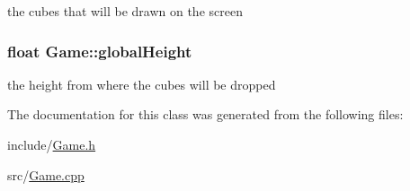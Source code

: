 the cubes that will be drawn on the screen 

\hypertarget{classGame_a61a6a4650669829ee22f39cc54d141b5}{
\subsubsection[{global\-Height}]{\setlength{\rightskip}{0pt plus 5cm}float {\bf \-Game\-::global\-Height}}}\label{classGame_a61a6a4650669829ee22f39cc54d141b5}


the height from where the cubes will be dropped 



\-The documentation for this class was generated from the following files\-:\begin{DoxyCompactItemize}
\item 
include/\hyperlink{Game_8h}{\-Game.\-h}\item 
src/\hyperlink{Game_8cpp}{\-Game.\-cpp}\end{DoxyCompactItemize}

